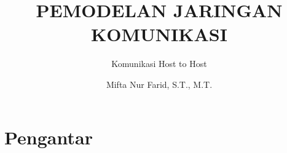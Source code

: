 \documentclass[pdflatex,compress]{beamer}
\title{PEMODELAN JARINGAN KOMUNIKASI}
\subtitle{Komunikasi Host to Host}
\author{Mifta Nur Farid, S.T., M.T.}
\begin{document}
\maketitle


\section{Pengantar}
\end{document}

